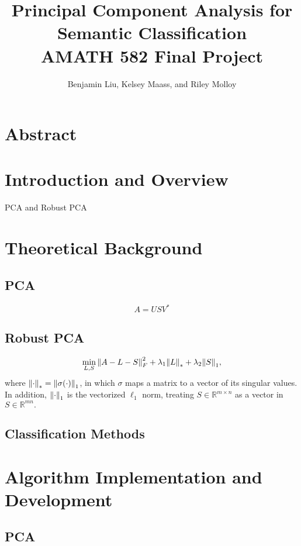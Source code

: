\documentclass{article}
\title{Principal Component Analysis for Semantic Classification \\ AMATH 582 Final Project}
\author{Benjamin Liu, Kelsey Maass, and Riley Molloy}
\newcommand{\R}{\mathbb{R}}
\begin{document}
\maketitle
\bigskip

\section*{Abstract}

\section{Introduction and Overview}
PCA and Robust PCA
\section{Theoretical Background}
\subsection{PCA}
\begin{equation} \label{svd}
A = U S V^*
\end{equation}

\subsection{Robust PCA}
\begin{equation} \label{robust_obj}
\min_{L,S} \norm{A-L-S}_{F}^2 + \lambda_1 \norm{L}_* + \lambda_2 \norm{S}_1,
\end{equation}
where $\norm{\cdot}_* = \norm{\sigma(\cdot)}_1$, in which $\sigma$ maps a matrix to a vector of its singular values. In addition, $\norm{\cdot}_1$ is the vectorized $\ell_1$ norm, treating $S \in \R^{m \times n}$ as a vector in $S \in \R^{mn}.$

\subsection{Classification Methods}
\section{Algorithm Implementation and Development}

\subsection{PCA}
\end{document}
